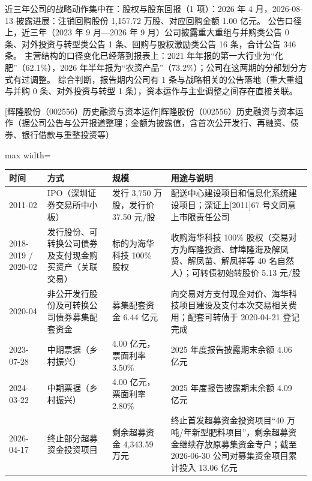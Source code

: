  近三年公司的战略动作集中在：股权与股东回报（1 项）：2026 年 4 月，2026-08-13 披露进展：注销回购股份 1,157.72 万股、对应回购金额 1.00 亿元。 公告口径上，近三年（2023 年 9 月---2026 年 9 月）公司披露重大重组与并购类公告 0 条、对外投资与转型类公告 1 条、回购与股权激励类公告 16 条，合计公告 346 条。 主营结构的口径变化已经落到报表上：2021 年年报的第一大行业为“化肥”（62.1\%），2026 年半年报为“农资产品”（73.2\%）；公司在这两期的分部划分方式有过调整。 综合判断，报告期内公司有 1 条与战略相关的公告落地（重大重组与并购 0 条、对外投资与转型 1 条），资本运作与主业调整之间存在直接关联。

\begin{center}\small\setlength{\tabcolsep}{4pt}
[辉隆股份（002556）历史融资与资本运作]{辉隆股份（002556）历史融资与资本运作（据公司公告与公开报道整理；金额为披露值，含首次公开发行、再融资、债券、银行借款与重整投资等）}
\begin{adjustbox}{max width=\textwidth}
\begin{tabular}{@{}p{1.45cm}p{2.55cm}p{4.05cm}p{4.95cm}@{}}
\toprule
时间 & 方式 & 规模 & 用途与说明 \\
\midrule
2011-02 & IPO（深圳证券交易所中小板） & 发行 3,\allowbreak{}750 万股，\allowbreak{}发行价 37.50 元/\allowbreak{}股 & 配送中心建设项目和信息化系统建设项目；深证上[2011]67 号文同意上市限责任公司 \\
2018-2019 /\allowbreak{} 2020-02 & 发行股份、可转换公司债券及支付现金购买资产（关联交易） & 标的为海华科技 100\% 股权 & 收购海华科技 100\% 股权（交易对方为辉隆投资、\allowbreak{}蚌埠隆海及解凤贤、\allowbreak{}解凤苗、\allowbreak{}解凤祥等 40 名自然人）；可转债初始转股价 5.13 元/\allowbreak{}股 \\
2020-04 & 非公开发行股份及可转换公司债券募集配套资金 & 募集配套资金 6.44 亿元 & 向交易对方支付现金对价、\allowbreak{}海华科技项目建设及支付本次交易相关费用；配套可转债于 2020-04-21 登记完成 \\
2023-07-28 & 中期票据（乡村振兴） & 4.00 亿元，\allowbreak{}票面利率 3.50\% & 2025 年度报告披露期末余额 4.06 亿元 \\
2024-03-22 & 中期票据（乡村振兴） & 4.00 亿元，\allowbreak{}票面利率 2.80\% & 2025 年度报告披露期末余额 4.09 亿元 \\
2026-04-17 & 终止部分超募资金投资项目 & 剩余超募资金 4,\allowbreak{}343.59 万元 & 终止首发超募资金投资项目“40 万吨/\allowbreak{}年新型肥料项目”，\allowbreak{}剩余超募资金继续存放原募集资金专户；截至 2026-06-30 公司对募集资金项目累计投入 13.06 亿元 \\
\bottomrule
\end{tabular}
\end{adjustbox}
\end{center}

